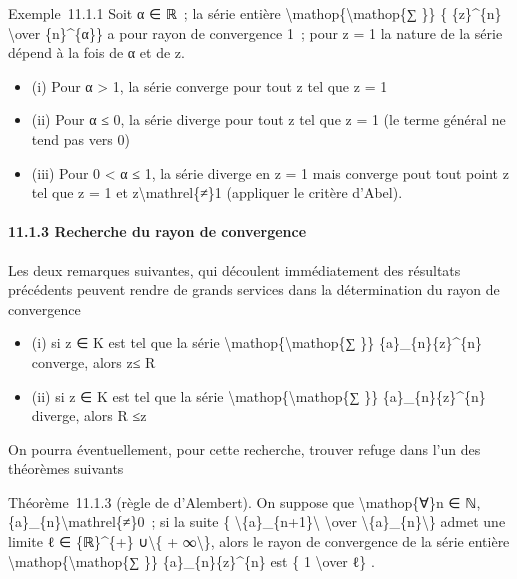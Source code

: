 \documentclass[]{article}
\begin{document}
Exemple~11.1.1 Soit α ∈ ℝ~; la série entière
\textbackslash{}mathop\{\textbackslash{}mathop\{∑ \}\} \{ \{z\}\^{}\{n\}
\textbackslash{}over \{n\}\^{}\{α\}\} a pour rayon de convergence 1~;
pour \textbar{}z\textbar{} = 1 la nature de la série dépend à la fois de
α et de z.

\begin{itemize}
\itemsep1pt\parskip0pt
\item
  (i) Pour α \textgreater{} 1, la série converge pour tout z tel que
  \textbar{}z\textbar{} = 1
\item
  (ii) Pour α ≤ 0, la série diverge pour tout z tel que
  \textbar{}z\textbar{} = 1 (le terme général ne tend pas vers 0)
\item
  (iii) Pour 0 \textless{} α ≤ 1, la série diverge en z = 1 mais
  converge pout tout point z tel que \textbar{}z\textbar{} = 1 et
  z\textbackslash{}mathrel\{≠\}1 (appliquer le critère d'Abel).
\end{itemize}

\paragraph{11.1.3 Recherche du rayon de convergence}

Les deux remarques suivantes, qui découlent immédiatement des résultats
précédents peuvent rendre de grands services dans la détermination du
rayon de convergence

\begin{itemize}
\itemsep1pt\parskip0pt
\item
  (i) si z ∈ K est tel que la série
  \textbackslash{}mathop\{\textbackslash{}mathop\{∑ \}\}
  \{a\}\_\{n\}\{z\}\^{}\{n\} converge, alors \textbar{}z\textbar{}≤ R
\item
  (ii) si z ∈ K est tel que la série
  \textbackslash{}mathop\{\textbackslash{}mathop\{∑ \}\}
  \{a\}\_\{n\}\{z\}\^{}\{n\} diverge, alors R ≤\textbar{}z\textbar{}
\end{itemize}

On pourra éventuellement, pour cette recherche, trouver refuge dans l'un
des théorèmes suivants

Théorème~11.1.3 (règle de d'Alembert). On suppose que
\textbackslash{}mathop\{∀\}n ∈ ℕ,
\{a\}\_\{n\}\textbackslash{}mathrel\{≠\}0~; si la suite \{
\textbackslash{}\textbar{}\{a\}\_\{n+1\}\textbackslash{}\textbar{}
\textbackslash{}over
\textbackslash{}\textbar{}\{a\}\_\{n\}\textbackslash{}\textbar{}\} admet
une limite ℓ ∈ \{ℝ\}\^{}\{+\} ∪\textbackslash{}\{ + ∞\textbackslash{}\},
alors le rayon de convergence de la série entière
\textbackslash{}mathop\{\textbackslash{}mathop\{∑ \}\}
\{a\}\_\{n\}\{z\}\^{}\{n\} est \{ 1 \textbackslash{}over ℓ\} .
\end{document}

